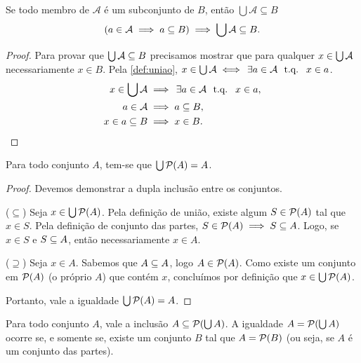 \begin{proposicao}
    \label{prop:uniao_familia_subconjunto}
    Se todo membro de \(\mathcal{A}\) é um subconjunto de \(B\), então \(\bigcup \mathcal{A} \subseteq B\)
    \[
        (a \in \AA \implies a \sub B) \implies \bigcup \AA \sub B.
    \]
\end{proposicao}

\begin{proof}
    Para provar que \(\bigcup \AA \sub B\) precisamos mostrar que para qualquer \(x \in \bigcup \AA\) necessariamente \(x \in B\). Pela \autoref{def:uniao}, \(x \in \bigcup \AA \iff \exists a \in \AA \tq x \in a\).
    \begin{align*}
        x \in \bigcup \AA & \implies \exists a \in \AA \tq x \in a, \\
        a \in \AA         & \implies a \sub B,                      \\
        x \in a \sub B    & \implies x \in B.
    \end{align*}
\end{proof}

\begin{proposicao}
    \label{prop:uniao_partes_identidade}
    Para todo conjunto \(A\), tem-se que \(\bigcup \PP(A) = A\).
\end{proposicao}

\begin{proof}
    Devemos demonstrar a dupla inclusão entre os conjuntos.

    (\(\subseteq\)) Seja \(x \in \bigcup \PP(A)\). Pela definição de união, existe algum \(S \in \PP(A)\) tal que \(x \in S\). Pela definição de conjunto das partes, \(S \in \PP(A) \implies S \sub A\). Logo, se \(x \in S\) e \(S \sub A\), então necessariamente \(x \in A\).

    (\(\supseteq\)) Seja \(x \in A\). Sabemos que \(A \sub A\), logo \(A \in \PP(A)\). Como existe um conjunto em \(\PP(A)\) (o próprio \(A\)) que contém \(x\), concluímos por definição que \(x \in \bigcup \PP(A)\).

    Portanto, vale a igualdade \(\bigcup \PP(A) = A\).
\end{proof}

\begin{proposicao}
    \label{prop:inclusao_A_partes_uniao}
    Para todo conjunto \(A\), vale a inclusão \(A \subseteq \PP(\bigcup A)\). A igualdade \(A = \PP(\bigcup A)\) ocorre se, e somente se, existe um conjunto \(B\) tal que \(A = \PP(B)\) (ou seja, se \(A\) é um conjunto das partes).
\end{proposicao}

